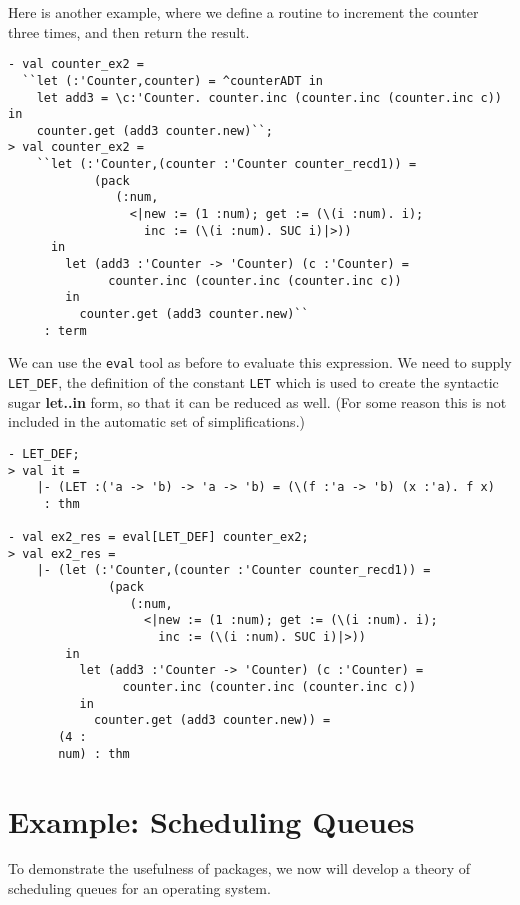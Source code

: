 Here is another example, where we define a routine to increment
the counter three times, and then return the result.
\begin{session}
\begin{verbatim}
- val counter_ex2 =
  ``let (:'Counter,counter) = ^counterADT in
    let add3 = \c:'Counter. counter.inc (counter.inc (counter.inc c)) in
    counter.get (add3 counter.new)``;
> val counter_ex2 =
    ``let (:'Counter,(counter :'Counter counter_recd1)) =
            (pack
               (:num,
                 <|new := (1 :num); get := (\(i :num). i);
                   inc := (\(i :num). SUC i)|>))
      in
        let (add3 :'Counter -> 'Counter) (c :'Counter) =
              counter.inc (counter.inc (counter.inc c))
        in
          counter.get (add3 counter.new)``
     : term
\end{verbatim}
\end{session}

We can use the {\tt eval} tool as before to evaluate this expression.
We need
to supply {\tt LET\_DEF}, 
the definition of the constant {\tt LET} which is used to create
the syntactic sugar {\bf let..in} form, 
so that it can be reduced as well. 
(For some reason this is not included in
the automatic set of simplifications.)
\begin{session}
\begin{verbatim}
- LET_DEF;
> val it =
    |- (LET :('a -> 'b) -> 'a -> 'b) = (\(f :'a -> 'b) (x :'a). f x)
     : thm
     
- val ex2_res = eval[LET_DEF] counter_ex2;
> val ex2_res =
    |- (let (:'Counter,(counter :'Counter counter_recd1)) =
              (pack
                 (:num,
                   <|new := (1 :num); get := (\(i :num). i);
                     inc := (\(i :num). SUC i)|>))
        in
          let (add3 :'Counter -> 'Counter) (c :'Counter) =
                counter.inc (counter.inc (counter.inc c))
          in
            counter.get (add3 counter.new)) =
       (4 :
       num) : thm
\end{verbatim}
\end{session}


\section{Example: Scheduling Queues}

To demonstrate the usefulness of packages, we now will develop a theory
of scheduling queues for an operating system.

